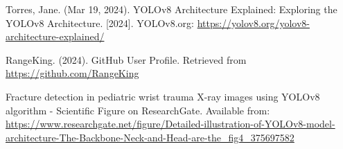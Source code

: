 \begin{thebibliography}{10}
        Torres, Jane. (Mar 19, 2024). YOLOv8 Architecture Explained: Exploring the YOLOv8 Architecture. [2024]. YOLOv8.org: \url{https://yolov8.org/yolov8-architecture-explained/}
        
        RangeKing. (2024). GitHub User Profile.
        Retrieved from \url{https://github.com/RangeKing}

        Fracture detection in pediatric wrist trauma X-ray images using YOLOv8 algorithm - Scientific Figure on ResearchGate. Available from: \url{https://www.researchgate.net/figure/Detailed-illustration-of-YOLOv8-model-architecture-The-Backbone-Neck-and-Head-are-the_fig4_375697582 }

  \end{thebibliography}
  